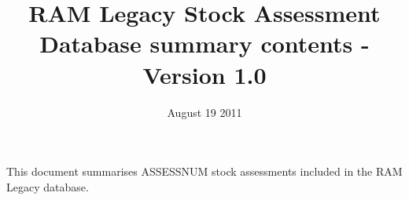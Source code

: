\documentclass [a4paper, 10pt] {article}
\title{RAM Legacy Stock Assessment Database summary contents - Version 1.0}
\date{August 19 2011}
\begin{document}
\maketitle{}
This document summarises ASSESSNUM stock assessments included in the RAM Legacy database.

\pagebreak
\tableofcontents
\end{document}
